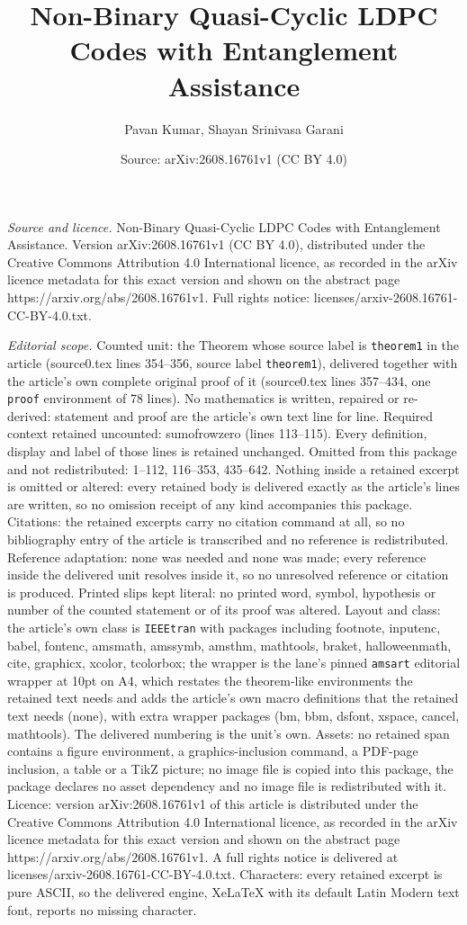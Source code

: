 \documentclass[10pt,a4paper]{amsart}
\title[Non-Binary Quasi-Cyclic LDPC Codes with Entanglement Assista]{Non-Binary Quasi-Cyclic LDPC Codes with Entanglement Assistance}
\author{Pavan Kumar, Shayan Srinivasa Garani}
\date{Source: arXiv:2608.16761v1 (CC BY 4.0)}
\begin{document}
\maketitle

\noindent\emph{Source and licence.} Non-Binary Quasi-Cyclic LDPC Codes with Entanglement Assistance. Version arXiv:2608.16761v1 (CC BY 4.0), distributed under the Creative Commons Attribution 4.0 International licence, as recorded in the arXiv licence metadata for this exact version and shown on the abstract page https://arxiv.org/abs/2608.16761v1. Full rights notice: licenses/arxiv-2608.16761-CC-BY-4.0.txt.\par\smallskip

\noindent\textit{Editorial scope.} Counted unit: the Theorem whose source label is \texttt{theorem1} in the article (source0.tex lines 354--356, source label \texttt{theorem1}), delivered together with the article's own complete original proof of it (source0.tex lines 357--434, one \texttt{proof} environment of 78 lines). No mathematics is written, repaired or re-derived: statement and proof are the article's own text line for line. Required context retained uncounted: sumofrowzero (lines 113--115). Every definition, display and label of those lines is retained unchanged. Omitted from this package and not redistributed: 1--112, 116--353, 435--642. Nothing inside a retained excerpt is omitted or altered: every retained body is delivered exactly as the article's lines are written, so no omission receipt of any kind accompanies this package. Citations: the retained excerpts carry no citation command at all, so no bibliography entry of the article is transcribed and no reference is redistributed. Reference adaptation: none was needed and none was made; every reference inside the delivered unit resolves inside it, so no unresolved reference or citation is produced. Printed slips kept literal: no printed word, symbol, hypothesis or number of the counted statement or of its proof was altered. Layout and class: the article's own class is \texttt{IEEEtran} with packages including footnote, inputenc, babel, fontenc, amsmath, amssymb, amsthm, mathtools, braket, halloweenmath, cite, graphicx, xcolor, tcolorbox; the wrapper is the lane's pinned \texttt{amsart} editorial wrapper at 10pt on A4, which restates the theorem-like environments the retained text needs and adds the article's own macro definitions that the retained text needs (none), with extra wrapper packages (bm, bbm, dsfont, xspace, cancel, mathtools). The delivered numbering is the unit's own. Assets: no retained span contains a figure environment, a graphics-inclusion command, a PDF-page inclusion, a table or a TikZ picture; no image file is copied into this package, the package declares no asset dependency and no image file is redistributed with it. Licence: version arXiv:2608.16761v1 of this article is distributed under the Creative Commons Attribution 4.0 International licence, as recorded in the arXiv licence metadata for this exact version and shown on the abstract page https://arxiv.org/abs/2608.16761v1. A full rights notice is delivered at licenses/arxiv-2608.16761-CC-BY-4.0.txt. Characters: every retained excerpt is pure ASCII, so the delivered engine, XeLaTeX with its default Latin Modern text font, reports no missing character.
\end{document}
